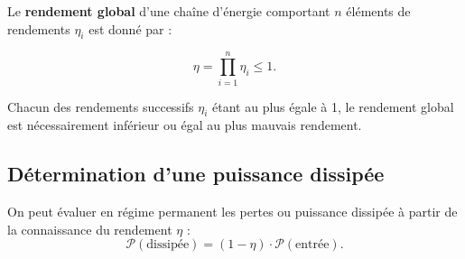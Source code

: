 \begin{prop}
Le \textbf{rendement global} d'une chaîne d'énergie comportant $n$ éléments de rendements $\eta_i$ est donné par : 

$$
\displaystyle{\eta=\prod_{i=1}^n\eta_i\leq 1}.
$$

Chacun des rendements successifs $\eta_i$ étant au plus égale à 1, le rendement global est nécessairement inférieur ou égal au plus mauvais rendement.
\end{prop}

\subsection{Détermination d'une puissance dissipée}

\begin{prop}
On peut évaluer en régime permanent les pertes ou puissance dissipée à partir de la connaissance du rendement $\eta$ : 
$$\mathcal{P}(\text{dissipée})=(1-\eta)\cdot \mathcal{P}(\text{entrée}).
$$
\end{prop}
